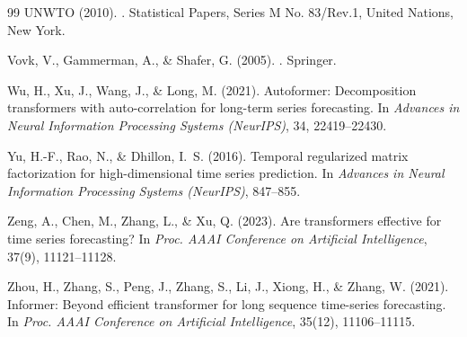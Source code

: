 \documentclass[12pt,a4paper,oneside]{report}
\begin{document}
\begin{thebibliography}{99}
UNWTO (2010).
.
\newblock Statistical Papers, Series M No. 83/Rev.1, United Nations, New York.

Vovk, V., Gammerman, A., \& Shafer, G. (2005).
.
\newblock Springer.

Wu, H., Xu, J., Wang, J., \& Long, M. (2021).
\newblock Autoformer: Decomposition transformers with auto-correlation for long-term series forecasting.
\newblock In {\em Advances in Neural Information Processing Systems (NeurIPS)}, 34, 22419--22430.

Yu, H.-F., Rao, N., \& Dhillon, I.~S. (2016).
\newblock Temporal regularized matrix factorization for high-dimensional time series prediction.
\newblock In {\em Advances in Neural Information Processing Systems (NeurIPS)}, 847--855.

Zeng, A., Chen, M., Zhang, L., \& Xu, Q. (2023).
\newblock Are transformers effective for time series forecasting?
\newblock In {\em Proc. AAAI Conference on Artificial Intelligence}, 37(9), 11121--11128.

Zhou, H., Zhang, S., Peng, J., Zhang, S., Li, J., Xiong, H., \& Zhang, W. (2021).
\newblock Informer: Beyond efficient transformer for long sequence time-series forecasting.
\newblock In {\em Proc. AAAI Conference on Artificial Intelligence}, 35(12), 11106--11115.

\end{thebibliography}

\cleardoublepage
\appendix


\cleardoublepage

\end{document}
